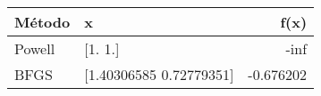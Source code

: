 \begin{tabular}{llr}
\toprule
Método & x & f(x) \\
\midrule
Powell & [1. 1.] & -inf \\
BFGS & [1.40306585 0.72779351] & -0.676202 \\
\bottomrule
\end{tabular}
